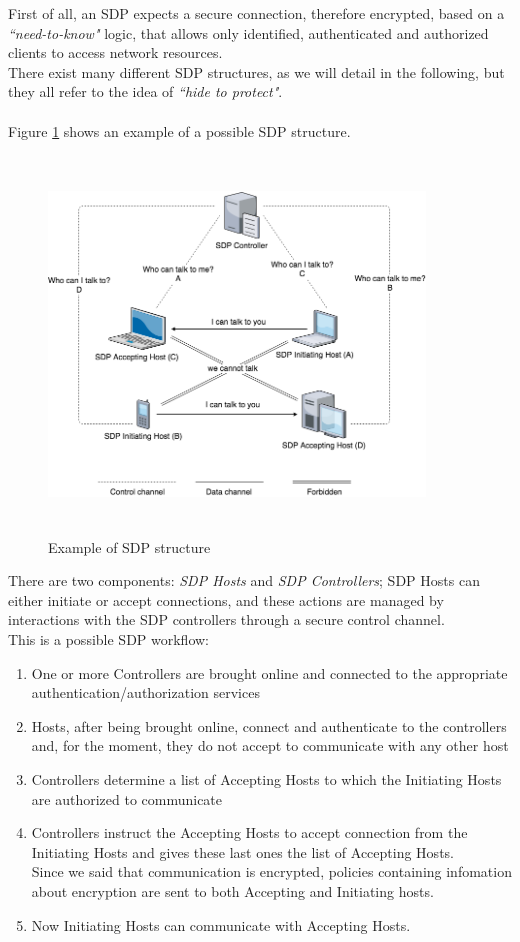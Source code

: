 \documentclass[12pt]{report}
\begin{document}
{First of all, an SDP expects a secure connection, therefore encrypted, based on a \emph{``need-to-know"} logic, that allows only identified, authenticated and authorized clients to access network resources.\\
There exist many different SDP structures, as we will detail in the following, but they all refer to the idea of \emph{``hide to protect"}.\\\\

Figure \ref{fig:sdpstructure} shows an example of a possible SDP structure.

\begin{figure}[H]
\includegraphics[width=10cm,height=10cm,keepaspectratio]{sdp_structure1}
\centering
\caption{Example of  SDP structure}
\label{fig:sdpstructure}
\end{figure}

There are two components: \emph{SDP Hosts} and \emph{SDP Controllers}; SDP Hosts can either initiate or accept connections, and these actions are managed by interactions with the SDP controllers through a secure control channel.\\
This is a possible SDP workflow:

\begin{enumerate}
\item One or more Controllers are brought online and connected to the appropriate authentication/authorization services
\item Hosts, after being brought online, connect and authenticate to the controllers and, for the moment, they do not accept to communicate with any other host
\item Controllers determine a list of Accepting Hosts to which the Initiating Hosts are authorized to communicate
\item Controllers instruct the Accepting Hosts to accept connection from the Initiating Hosts and gives these last ones the list of Accepting Hosts.\\
Since we said that communication is encrypted, policies containing infomation about encryption are sent to both Accepting and Initiating hosts.
\item Now Initiating Hosts can communicate with Accepting Hosts.\\
\end{enumerate}

}
\end{document}
